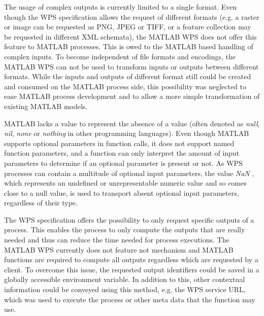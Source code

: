     The usage of complex outputs is currently limited to a single format. Even though the WPS specification allows the request of different formats (e.g. a raster or image can be requested as PNG, JPEG or TIFF, or a feature collection may be requested in different XML schemata), the MATLAB WPS does not offer this feature to MATLAB processes. This is owed to the MATLAB based handling of complex inputs. To become independent of file formats and encodings, the MATLAB WPS can not be used to transform inputs or outputs between different formats. While the inputs and outputs of different format still could be created and consumed on the MATLAB process side, this possibility was neglected to ease MATLAB process development and to allow a more simple transformation of existing MATLAB models.

    MATLAB lacks a value to represent the absence of a value (often denoted as \emph{null}, \emph{nil}, \emph{none} or \emph{nothing} in other programming languages). Even though MATLAB supports optional parameters in function calls, it does not support named function parameters, and a function can only interpret the amount of input parameters to determine if an optional parameter is present or not. As WPS processes can contain a multitude of optional input parameters, the value \emph{NaN} \citep{ieee:754:2008}, which represents an undefined or unrepresentable numeric value and so comes close to a null value, is used to transport absent optional input parameters, regardless of their type.

    The WPS specification offers the possibility to only request specific outputs of a process. This enables the process to only compute the outputs that are really needed and thus can reduce the time needed for process executions. The MATLAB WPS currently does not feature not mechanism and MATLAB functions are required to compute all outputs regardless which are requested by a client.
    To overcome this issue, the requested output identifiers could be saved in a globally accessible environment variable. In addition to this, other contextual information could be conveyed using this method, e.g. the WPS service URL, which was used to execute the process or other meta data that the function may use.

